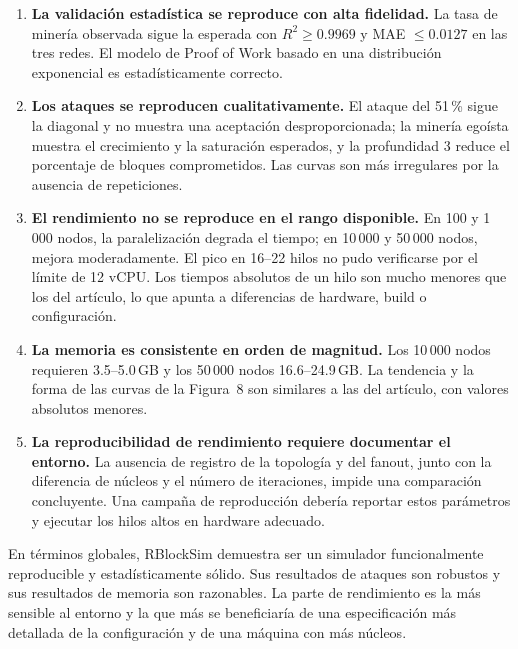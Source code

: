 \documentclass[11pt,a4paper,oneside]{article}
\begin{document}
\begin{enumerate}
  \item \textbf{La validación estadística se reproduce con alta fidelidad.} La tasa de minería observada sigue la esperada con $R^2 \ge 0.9969$ y MAE $\le 0.0127$ en las tres redes. El modelo de Proof of Work basado en una distribución exponencial es estadísticamente correcto.
  \item \textbf{Los ataques se reproducen cualitativamente.} El ataque del 51\,\% sigue la diagonal y no muestra una aceptación desproporcionada; la minería egoísta muestra el crecimiento y la saturación esperados, y la profundidad 3 reduce el porcentaje de bloques comprometidos. Las curvas son más irregulares por la ausencia de repeticiones.
  \item \textbf{El rendimiento no se reproduce en el rango disponible.} En 100 y 1\,000 nodos, la paralelización degrada el tiempo; en 10\,000 y 50\,000 nodos, mejora moderadamente. El pico en 16--22 hilos no pudo verificarse por el límite de 12 vCPU. Los tiempos absolutos de un hilo son mucho menores que los del artículo, lo que apunta a diferencias de hardware, build o configuración.
  \item \textbf{La memoria es consistente en orden de magnitud.} Los 10\,000 nodos requieren 3.5--5.0\,GB y los 50\,000 nodos 16.6--24.9\,GB. La tendencia y la forma de las curvas de la Figura~8 son similares a las del artículo, con valores absolutos menores.
  \item \textbf{La reproducibilidad de rendimiento requiere documentar el entorno.} La ausencia de registro de la topología y del fanout, junto con la diferencia de núcleos y el número de iteraciones, impide una comparación concluyente. Una campaña de reproducción debería reportar estos parámetros y ejecutar los hilos altos en hardware adecuado.
\end{enumerate}

En términos globales, RBlockSim demuestra ser un simulador funcionalmente reproducible y estadísticamente sólido. Sus resultados de ataques son robustos y sus resultados de memoria son razonables. La parte de rendimiento es la más sensible al entorno y la que más se beneficiaría de una especificación más detallada de la configuración y de una máquina con más núcleos.

\cleardoublepage

\printbibliography[title={Referencias}]
\end{document}
